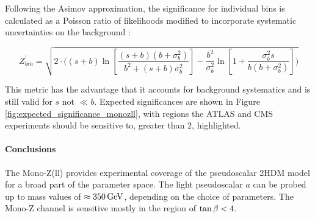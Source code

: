 Following the Asimov approximation, the significance for individual bins is calculated as a Poisson ratio of likelihoods modified to incorporate  systematic uncertainties on the background  \cite{Cowan:2012}:  

\begin{equation}
\label{eq:significance_wsyst}
Z^\prime_{bin} = \sqrt{ 2 \cdot \bigg( (s+b) \ln[\frac{ (s+b) (b+\sigma_b^2) } {b^2 + (s+b) \sigma_b^2} ]- \frac{b^2}{\sigma_b^2} \ln[1 + \frac{\sigma_b^2 s}{b(b+\sigma_b^2)} ] \bigg) }
\end{equation}

This metric has the advantage that it accounts for background systematics and is still valid for $s$ not $\ll b$.  Expected significances are shown in Figure \ref{fig:expected_significance_monozll}, with regions the ATLAS and CMS experiments should be sensitive to, greater than 2, highlighted.



\paragraph{Conclusions} The Mono-Z(ll) provides experimental coverage of the pseudoscalar 2HDM model for a broad part of the parameter space. The light pseudoscalar $a$ can be probed up to mass values of $\approx\unit[350]{GeV}$, depending on the choice of parameters. The Mono-Z channel is sensitive mostly in the region of $\tan\beta<4$.

